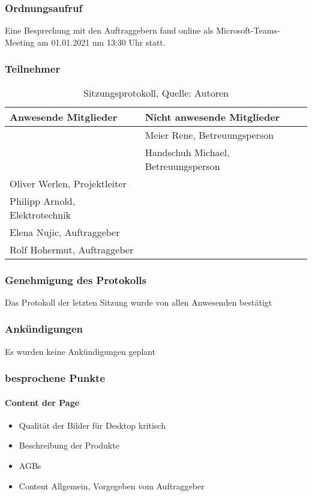\subsubsection{Ordnungsaufruf}
Eine Besprechung mit den Auftraggebern fand online als Microsoft-Teams-Meeting am 01.01.2021 um 13:30 Uhr statt.
\subsubsection{Teilnehmer}
\begin{table}[H]
	\setlength\extrarowheight{2pt} %
	\begin{tabularx}{\textwidth}{|X|X|}
		\hline
		\textbf{Anwesende Mitglieder} &  \textbf{Nicht anwesende Mitglieder} \\
		\hline
		& Meier Rene, Betreuungsperson  \\
		& Handschuh Michael, Betreuungsperson   \\
		Oliver Werlen, Projektleiter &  \\
		Philipp Arnold, Elektrotechnik & \\
		Elena Nujic, Auftraggeber & \\
		Rolf Hohermut, Auftraggeber & \\
		\hline
	\end{tabularx}
	\caption{ \label{tbl: Teilnehmerliste vom 01.04.2021}Sitzungsprotokoll, Quelle: Autoren}
\end{table}
\subsubsection{Genehmigung des Protokolls}
Das Protokoll der letzten Sitzung wurde von allen Anwesenden bestätigt
\subsubsection{Ankündigungen}
Es wurden keine Ankündigungen geplant
\subsubsection{besprochene Punkte}
\paragraph{Content der Page}
\begin{itemize}
	\item Qualität der Bilder für Desktop kritisch
	\item Beschreibung der Produkte
	\item AGBs
	\item Content Allgemein, Vorgegeben vom Auftraggeber
\end{itemize}


